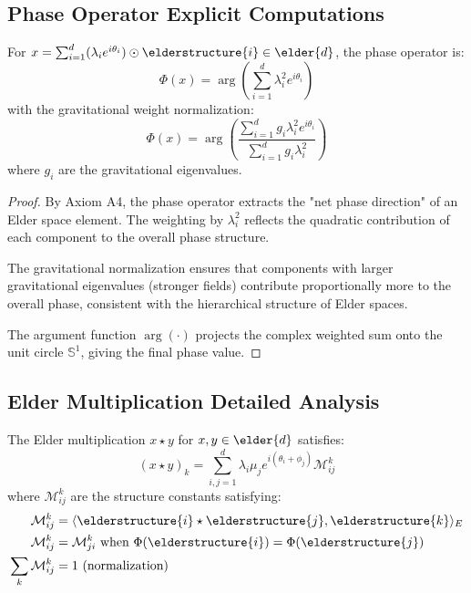 \subsection{Phase Operator Explicit Computations}

\begin{theorem}
For $x = \sum_{i=1}^{d} (\lambda_i e^{i\theta_i}) \odot \elderstructure{i} \in \elder{d}$, the phase operator is:
\begin{equation}
\Phi(x) = \arg\left(\sum_{i=1}^{d} \lambda_i^2 e^{i\theta_i}\right)
\end{equation}
with the gravitational weight normalization:
\begin{equation}
\Phi(x) = \arg\left(\frac{\sum_{i=1}^{d} g_i \lambda_i^2 e^{i\theta_i}}{\sum_{i=1}^{d} g_i \lambda_i^2}\right)
\end{equation}
where $g_i$ are the gravitational eigenvalues.
\end{theorem}

\begin{proof}
By Axiom A4, the phase operator extracts the "net phase direction" of an Elder space element. The weighting by $\lambda_i^2$ reflects the quadratic contribution of each component to the overall phase structure.

The gravitational normalization ensures that components with larger gravitational eigenvalues (stronger fields) contribute proportionally more to the overall phase, consistent with the hierarchical structure of Elder spaces.

The argument function $\arg(\cdot)$ projects the complex weighted sum onto the unit circle $\mathbb{S}^1$, giving the final phase value.
\end{proof}

\subsection{Elder Multiplication Detailed Analysis}

\begin{theorem}
The Elder multiplication $x \star y$ for $x, y \in \elder{d}$ satisfies:
\begin{equation}
(x \star y)_k = \sum_{i,j=1}^{d} \lambda_i \mu_j e^{i(\theta_i + \phi_j)} \mathcal{M}_{ij}^k
\end{equation}
where $\mathcal{M}_{ij}^k$ are the structure constants satisfying:
\begin{align}
\mathcal{M}_{ij}^k &= \langle \elderstructure{i} \star \elderstructure{j}, \elderstructure{k} \rangle_E\\
\mathcal{M}_{ij}^k &= \mathcal{M}_{ji}^k \text{ when } \Phi(\elderstructure{i}) = \Phi(\elderstructure{j})\\
\sum_k \mathcal{M}_{ij}^k &= 1 \text{ (normalization)}
\end{align}
\end{theorem}

